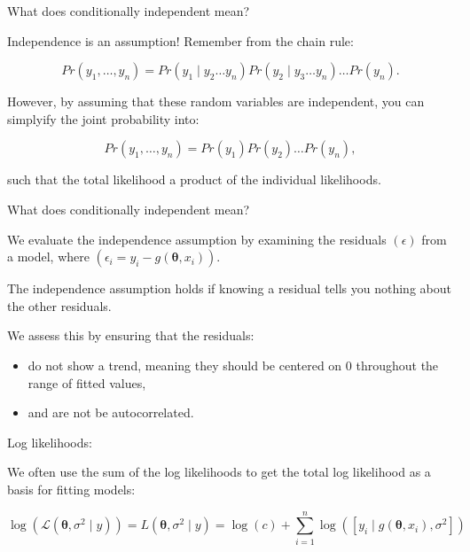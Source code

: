 \documentclass[ignorenonframetext,]{beamer}
\providecommand{\tightlist}{%
  \setlength{\itemsep}{0pt}\setlength{\parskip}{0pt}}
\begin{document}
\begin{frame}{What does conditionally independent mean?}

Independence is an assumption! Remember from the chain rule:

\[Pr(y_{1},\ldots,y_{n}) = Pr(y_{1} \mid y_2\dots y_{n})Pr(y_{2} \mid y_{3}\ldots y_{n})\ldots Pr(y_{n}).\]

However, by assuming that these random variables are independent, you
can simplyify the joint probability into:

\[Pr(y_{1},\ldots,y_{n}) = Pr(y_{1})Pr(y_{2})\ldots Pr(y_{n}),\]

such that the total likelihood a product of the individual likelihoods.

\end{frame}

\begin{frame}{What does conditionally independent mean?}

We evaluate the independence assumption by examining the residuals
\((\epsilon)\) from a model, where
\((\epsilon_{i}=y_{i}-g(\bm{\theta},x_{i}))\).

The independence assumption holds if knowing a residual tells you
nothing about the other residuals.

We assess this by ensuring that the residuals:

\begin{itemize}
\tightlist
\item
  do not show a trend, meaning they should be centered on 0 throughout
  the range of fitted values,
\item
  and are not be autocorrelated.
\end{itemize}

\end{frame}

\begin{frame}{Log likelihoods:}

We often use the sum of the log likelihoods to get the total log
likelihood as a basis for fitting models:

\[\log(\mathscr{L}(\bm{\theta}, \sigma^{2} \mid y))=L(\bm{\theta}, \sigma^{2} \mid y) =\log(c)+\sum_{i=1}^{n}\log([y_{i}\mid g(\bm{\theta}, x_{i}),\sigma^{2}])\]

\end{frame}
\end{document}
